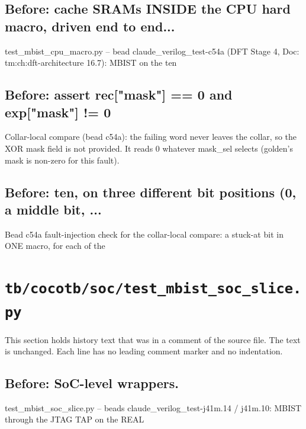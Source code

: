 \begin{record}

\subsection*{Before: cache SRAMs INSIDE the CPU hard macro, driven end to end...}

\begin{textblock}
test_mbist_cpu_macro.py -- bead claude_verilog_test-c54a (DFT Stage 4, Doc: tm:ch:dft-architecture 16.7): MBIST on the ten
\end{textblock}

\subsection*{Before: assert rec["mask"] == 0 and exp["mask"] != 0}

\begin{textblock}
Collar-local compare (bead c54a): the failing word never leaves the collar, so the XOR mask field is not
provided. It reads 0 whatever mask_sel selects (golden's mask is non-zero for this fault).
\end{textblock}

\subsection*{Before: ten, on three different bit positions (0, a middle bit, ...}

\begin{textblock}
Bead c54a fault-injection check for the collar-local compare: a stuck-at bit in ONE macro, for each of the
\end{textblock}

\end{record}

\section{\texttt{tb/cocotb/soc/test\_mbist\_soc\_slice.py}}\label{cr:suite:soc-test-mbist-soc-slice}

This section holds history text that was in a comment of the source file. The text is unchanged. Each line has no leading comment marker and no indentation.

\begin{record}

\subsection*{Before: SoC-level wrappers.}

\begin{textblock}
test_mbist_soc_slice.py -- beads claude_verilog_test-j41m.14 / j41m.10: MBIST through the JTAG TAP on the REAL
\end{textblock}

\end{record}

